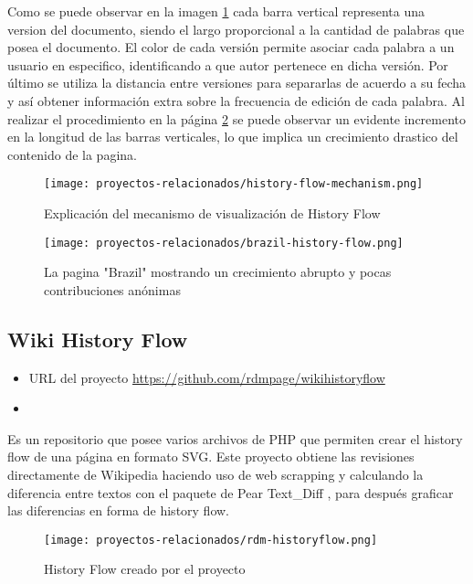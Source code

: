 Como se puede observar en la imagen \ref*{fig:history-flow-mechanism} cada barra vertical representa una version del documento, siendo el largo proporcional a la cantidad de palabras que posea el documento. El color de cada versión permite asociar cada palabra a un usuario en especifico, identificando a que autor pertenece en dicha versión. Por último se utiliza la distancia entre versiones para separarlas de acuerdo a su fecha y así obtener información extra sobre la frecuencia de edición de cada palabra. Al realizar el procedimiento en la página  \ref*{fig:brazil-history-flow} se puede observar un evidente incremento en la longitud de las barras verticales, lo que implica un crecimiento drastico del contenido de la pagina.

\begin{figure}[H]
    \texttt{[image: proyectos-relacionados/history-flow-mechanism.png]}
    \caption{Explicación del mecanismo de visualización de History Flow}
    \label{fig:history-flow-mechanism}
\end{figure}

\begin{figure}[H]
    \texttt{[image: proyectos-relacionados/brazil-history-flow.png]}
    \caption{La pagina "Brazil" mostrando un crecimiento abrupto y pocas contribuciones anónimas}
    \label{fig:brazil-history-flow}
\end{figure}

\subsection{Wiki History Flow}

\begin{itemize}
    \item URL del proyecto \url{https://github.com/rdmpage/wikihistoryflow}
    \item
\end{itemize}

Es un repositorio que posee varios archivos de PHP que permiten crear el history flow de una página en formato SVG. Este proyecto obtiene las revisiones directamente de Wikipedia haciendo uso de web scrapping y calculando la diferencia entre textos con el paquete de Pear Text\_Diff \cite{pear_text_diff}, para después graficar las diferencias en forma de history flow.

\begin{figure}[H]
    \texttt{[image: proyectos-relacionados/rdm-historyflow.png]}
    \caption{History Flow creado por el proyecto}
    \label{fig:rdm-historyflow}
\end{figure}


